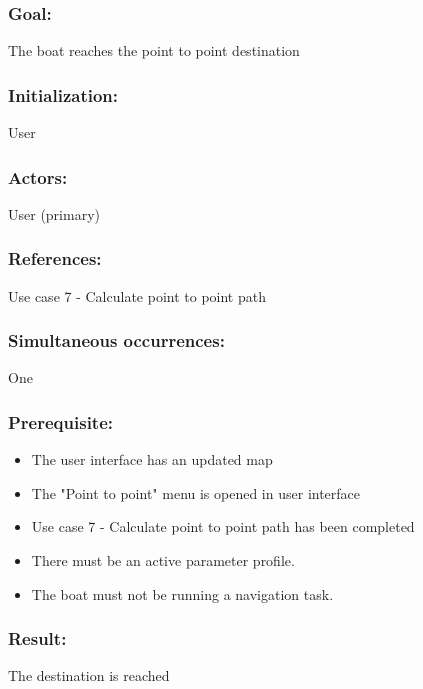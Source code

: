 \subsubsection*{Goal:}
The boat reaches the point to point destination

\subsubsection*{Initialization:}
User

\subsubsection*{Actors:}
User (primary)

\subsubsection*{References:}
Use case 7 - Calculate point to point path

\subsubsection*{Simultaneous occurrences:}
One 

\subsubsection*{Prerequisite:}
\begin{itemize}
	\item The user interface has an updated map
	\item The "Point to point" menu is opened in user interface
	\item Use case 7 - Calculate point to point path has been completed
	\item There must be an active parameter profile.
	\item The boat must not be running a navigation task.
\end{itemize}

\subsubsection*{Result:}
The destination is reached

